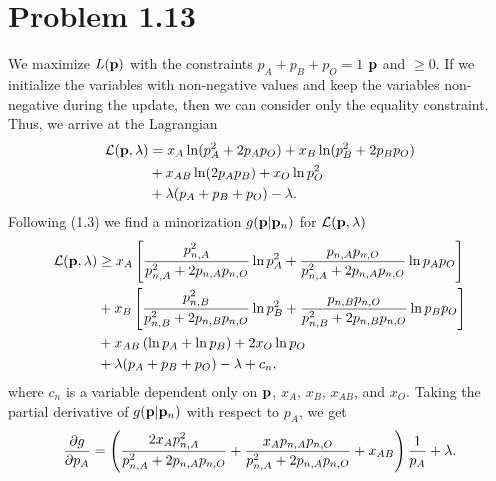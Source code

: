 \documentclass{scrartcl}
\begin{document}

\section*{Problem 1.13}

We maximize $L(\mathbf{p})$ with the constraints $p_A + p_B + p_O = 1$ $\mathbf{p}$
and $\ge 0$. If we initialize the variables with non-negative values and keep
the variables non-negative during the update, then we can consider only the
equality constraint. Thus, we arrive at the Lagrangian
\begin{equation}
	\begin{split}
	\mathcal{L} (\mathbf{p}, \lambda)
	& = x_A \ln(p_A^2+2p_Ap_O) + x_B \ln(p_B^2+2p_Bp_O) \\
	& + x_{AB} \ln(2p_Ap_B)+x_O \ln p_O^2 \\
	& + \lambda ( p_A + p_B + p_O ) - \lambda .
	\end{split}
\end{equation}
Following (1.3) we find a minorization $g(\mathbf{p} | \mathbf{p}_n)$ for $\mathcal{L} (\mathbf{p}, \lambda)$
\begin{equation}
	\begin{split}
		\mathcal{L} (\mathbf{p}, \lambda)
		& \ge x_A \left[ \frac{p_{n,A}^2}{p_{n,A}^2+2p_{n,A}p_{n,O}} \ln p_A^2 +
						 \frac{p_{n,A}p_{n,O}}{p_{n,A}^2+2p_{n,A}p_{n,O}} \ln p_Ap_O		          
		          \right] \\
		& + x_B \left[ \frac{p_{n,B}^2}{p_{n,B}^2+2p_{n,B}p_{n,O}} \ln p_B^2 +
						 \frac{p_{n,B}p_{n,O}}{p_{n,B}^2+2p_{n,B}p_{n,O}} \ln p_Bp_O		          
		        \right] \\
		& + x_{AB} \left( \ln p_A + \ln p_B \right) + 2x_O \ln p_O \\
		& + \lambda ( p_A + p_B + p_O ) - \lambda + c_n ,
	\end{split}
\end{equation}
where $c_n$ is a variable dependent only on $\mathbf{p}$, $x_A$, $x_B$, $x_{AB}$, and $x_O$.
Taking the partial derivative of $g(\mathbf{p}|\mathbf{p}_n)$ with respect to $p_A$, we get
\begin{equation}
	\begin{split}
	{\partial g \over \partial p_A}
	= \left( \frac{2 x_A p_{n,A}^2}{p_{n,A}^2 + 2p_{n,A}p_{n,O}}
	+ \frac{ x_A p_{n,A}p_{n,O}}{p_{n,A}^2 + 2p_{n,A}p_{n,O}}
	+ x_{AB} \right) {1 \over p_A} + \lambda .
	\end{split}
\end{equation}
\end{document}
